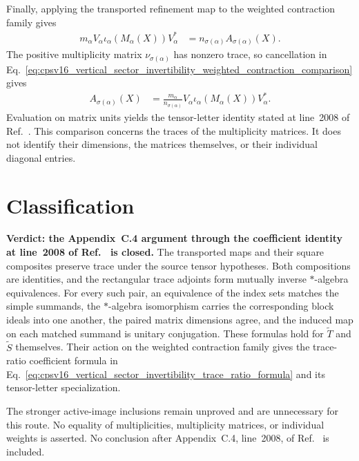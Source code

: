 \documentclass{article}
\begin{document}
Finally, applying the transported refinement map to the weighted contraction
family gives
\begin{align}
    m_\alpha V_\alpha\iota_\alpha(M_\alpha(X))V_\alpha^*
        &= n_{\sigma(\alpha)}A_{\sigma(\alpha)}(X).
    \label{eq:cpsv16_vertical_sector_invertibility_weighted_contraction_comparison}
\end{align}
The positive multiplicity matrix $\nu_{\sigma(\alpha)}$ has nonzero trace, so
cancellation in
Eq.~\ref{eq:cpsv16_vertical_sector_invertibility_weighted_contraction_comparison}
gives
\begin{align}
    A_{\sigma(\alpha)}(X)
        &= \frac{m_\alpha}{n_{\sigma(\alpha)}}
           V_\alpha\iota_\alpha(M_\alpha(X))V_\alpha^*.
    \label{eq:cpsv16_vertical_sector_invertibility_trace_ratio_formula}
\end{align}
Evaluation on matrix units yields the tensor-letter identity stated at
line~2008 of Ref.~\cite{Cirac2016MPDO_arXiv}. This comparison concerns the
traces of the multiplicity matrices. It does not identify their dimensions,
the matrices themselves, or their individual diagonal entries.

\section{Classification}

\textbf{Verdict: the Appendix~C.4 argument through the coefficient identity at
line~2008 of Ref.~\cite{Cirac2016MPDO_arXiv} is closed.}
The transported maps and their square composites preserve trace under the
source tensor hypotheses. Both compositions are identities, and the
rectangular trace adjoints form mutually inverse $*$-algebra equivalences.
For every such pair, an equivalence of the index sets matches the simple
summands, the $*$-algebra isomorphism carries the corresponding block ideals
into one another, the paired matrix dimensions agree, and the induced map on
each matched summand is unitary conjugation. These formulas hold for
$\widetilde T$ and $\widetilde S$ themselves. Their action on the weighted
contraction family gives the trace-ratio coefficient formula in
Eq.~\ref{eq:cpsv16_vertical_sector_invertibility_trace_ratio_formula} and its
tensor-letter specialization.

The stronger active-image inclusions remain unproved and are unnecessary for
this route. No equality of multiplicities, multiplicity matrices, or
individual weights is asserted. No conclusion after Appendix~C.4, line~2008,
of Ref.~\cite{Cirac2016MPDO_arXiv} is included.



\end{document}
